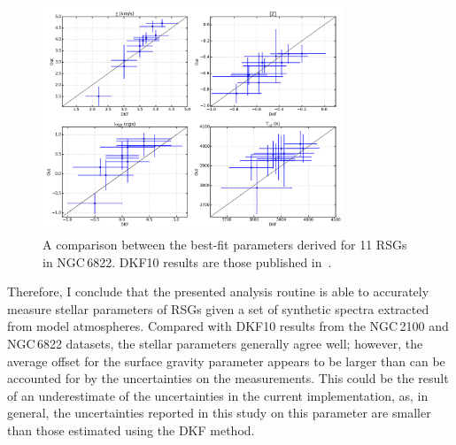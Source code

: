 \begin{figure}
 \centering
 \includegraphics[width=0.80\textwidth]{JAnal/NGC6822-par-compare}
 \caption[The best-fit parameter comparison between the results presented in Chapter~\ref{ch:ngc6822} and those of DKF10]{
A comparison between the best-fit parameters derived for 11 RSGs in NGC\,6822.
DKF10 results are those published in~\cite{2015ApJ...803...14P}.
\label{fig:n6822DKF}
         }
\end{figure}

Therefore, I conclude that the presented analysis routine is able to accurately measure stellar parameters of RSGs given a set of synthetic spectra extracted from model atmospheres.
Compared with DKF10 results from the NGC\,2100 and NGC\,6822 datasets, the stellar parameters generally agree well; however, the average offset for the surface gravity parameter appears to be larger than can be accounted for by the uncertainties on the measurements.
This could be the result of an underestimate of the uncertainties in the current implementation, as, in general, the uncertainties reported in this study on this parameter are smaller than those estimated using the DKF method.

